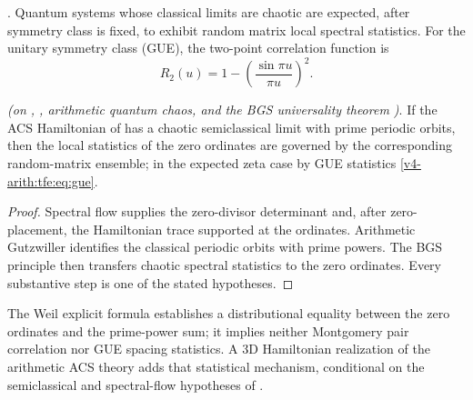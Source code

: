\begin{theorem}
\label{v4-arith:tfe:thm:bgs}
\ClaimStatusConjectured. Quantum systems whose classical limits are
chaotic are expected, after symmetry class is fixed, to exhibit random
matrix local spectral statistics. For the unitary symmetry class (GUE),
the two-point correlation function is
\begin{equation}
\label{v4-arith:tfe:eq:gue}
R_2(u)=1-\left(\frac{\sin \pi u}{\pi u}\right)^2.
\end{equation}
\end{theorem}

\begin{theorem}
\label{v4-arith:tfe:thm:stat-upside}
\ClaimStatusConditional \emph{(on
,
,
arithmetic quantum chaos, and the BGS universality theorem
)}. If the ACS Hamiltonian
of  has a chaotic
semiclassical limit with prime periodic orbits, then the local
statistics of the zero ordinates are governed by the corresponding
random-matrix ensemble; in the expected zeta case by GUE statistics
\eqref{v4-arith:tfe:eq:gue}.
\end{theorem}

\begin{proof}
Spectral flow supplies the zero-divisor determinant and, after
zero-placement, the Hamiltonian trace supported at the ordinates. Arithmetic
Gutzwiller identifies the classical periodic orbits with prime powers.
The BGS principle then transfers chaotic spectral statistics to the
zero ordinates. Every substantive step is one of the stated
hypotheses.
\end{proof}

\begin{remark}
\label{v4-arith:tfe:rem:content-added}
The Weil explicit formula establishes a distributional equality between
the zero ordinates and the prime-power sum; it implies neither
Montgomery pair correlation nor GUE spacing statistics. A 3D
Hamiltonian realization of the arithmetic ACS theory adds that
statistical mechanism, conditional on the semiclassical and
spectral-flow hypotheses of .
\end{remark}

